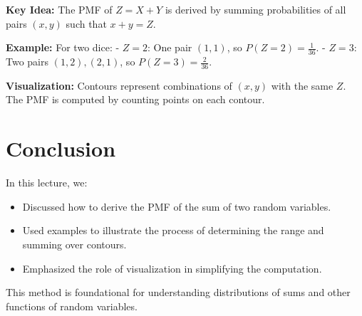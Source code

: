 \documentclass{article}
\begin{document}
\textbf{Key Idea:}
The PMF of $Z = X + Y$ is derived by summing probabilities of all pairs $(x, y)$ such that $x + y = Z$.

\textbf{Example:}
For two dice:
- $Z = 2$: One pair $(1, 1)$, so $P(Z = 2) = \frac{1}{36}$.
- $Z = 3$: Two pairs $(1, 2), (2, 1)$, so $P(Z = 3) = \frac{2}{36}$.

\textbf{Visualization:}
Contours represent combinations of $(x, y)$ with the same $Z$. The PMF is computed by counting points on each contour.

\section*{Conclusion}

In this lecture, we:
\begin{itemize}
  \item Discussed how to derive the PMF of the sum of two random variables.
  \item Used examples to illustrate the process of determining the range and summing over contours.
  \item Emphasized the role of visualization in simplifying the computation.
\end{itemize}

This method is foundational for understanding distributions of sums and other functions of random variables.
\end{document}

